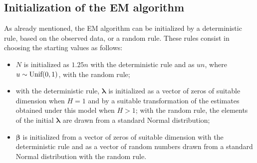 \subsection*{Initialization of the EM algorithm}
%
As already mentioned, the EM algorithm can be initialized by a deterministic rule, based on the observed data, or a random rule.
These rules consist in choosing the starting values as follows:
%
\begin{itemize}
%
\item $N$ is initialized as $1.25n$ with the deterministic rule and as $u n$, where $u\sim {\rm Unif(0,1)}$, with the random rule;
%
\item with the deterministic rule, $\bm{\lambda}$ is initialized as a vector of zeros of suitable dimension when $H=1$ and by a suitable transformation of the estimates obtained under this model when $H>1$; with the random rule, the elements of the initial $\bm{\lambda}$ are drawn from a standard Normal distribution;
%
\item $\bm{\beta}$ is initialized from a vector of zeros of suitable dimension with the deterministic rule and as a vector of random numbers drawn from a standard Normal distribution with the random rule.
%
\end{itemize}



\address{Francesco Bartolucci\\
  Department of Economics, University of Perugia\\
  Perugia, 06124\\
  Italy\\
  (0000-0001-7057-1421)\\
  }

\address{Antonio Forcina\\
  Formerly at University of Perugia\\
  Perugia, 06124\\
  Italy\\
(0000-0001-5239-5495)\\
  }

